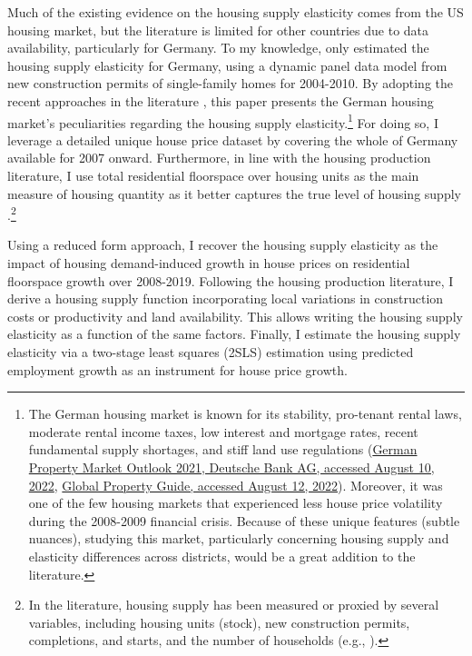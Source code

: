 \documentclass[
  12pt,
]{article}
\begin{document}
Much of the existing evidence on the housing supply elasticity comes
from the US housing market, but the literature is limited for other
countries due to data availability, particularly for Germany. To my
knowledge, only \citet{lerbs_2014} estimated the housing supply
elasticity for Germany, using a dynamic panel data model from new
construction permits of single-family homes for 2004-2010. By adopting
the recent approaches in the literature
\citep{saiz_2010, hilber_vermeulen_2016, baum-snow_han_2019}, this paper
presents the German housing market's peculiarities regarding the housing
supply elasticity.\footnote{The German housing market is known for its
  stability, pro-tenant rental laws, moderate rental income taxes, low
  interest and mortgage rates, recent fundamental supply shortages, and
  stiff land use regulations
  (\href{https://www.dbresearch.com/PROD/RPS_EN-PROD/PROD_0000000000517463/Outlook_for_the_German_residential_property_market.pdf?undefined&realload=OGCzKhorommVYqr3DKzCKCT/4~0T75BVVmGs5XHbQs3QdBI~xyjvWG3i2CAeU6MJ}{German
  Property Market Outlook 2021, Deutsche Bank AG, accessed August 10,
  2022},
  \href{https://www.globalpropertyguide.com/Europe/Germany}{Global
  Property Guide, accessed August 12, 2022}). Moreover, it was one of
  the few housing markets that experienced less house price volatility
  during the 2008-2009 financial crisis. Because of these unique
  features (subtle nuances), studying this market, particularly
  concerning housing supply and elasticity differences across districts,
  would be a great addition to the literature.} For doing so, I leverage
a detailed unique house price dataset by \citet{rwi_redhk_2020} covering
the whole of Germany available for 2007 onward. Furthermore, in line
with the housing production literature, I use total residential
floorspace over housing units as the main measure of housing quantity as
it better captures the true level of housing supply
\citep{baum-snow_han_2019, epple_etal_2010}.\footnote{In the literature,
  housing supply has been measured or proxied by several variables,
  including housing units (stock), new construction permits,
  completions, and starts, and the number of households (e.g.,
  \citet{saiz_2010}).}

Using a reduced form approach, I recover the housing supply elasticity
as the impact of housing demand-induced growth in house prices on
residential floorspace growth over 2008-2019. Following the housing
production literature, I derive a housing supply function incorporating
local variations in construction costs or productivity and land
availability. This allows writing the housing supply elasticity as a
function of the same factors. Finally, I estimate the housing supply
elasticity via a two-stage least squares (2SLS) estimation using
predicted employment growth as an instrument for house price growth.
\end{document}
